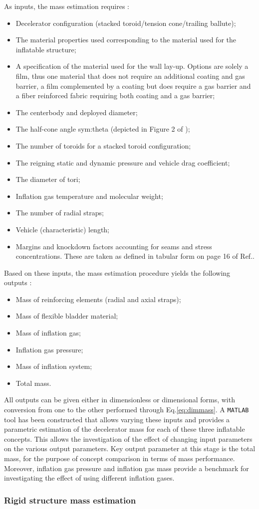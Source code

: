 As inputs, the mass estimation requires \cite{Samareh2011}:
\begin{itemize}
\item Decelerator configuration (stacked toroid/tension cone/trailing ballute);
\item The material properties used corresponding to the material used for the inflatable structure; 
\item A specification of the material used for the wall lay-up. Options are solely a film, thus one material that does not require an additional coating and gas barrier, a film complemented by a coating but does require a gas barrier and a fiber reinforced fabric requiring both coating and a gas barrier;
\item The centerbody and deployed diameter;
\item The half-cone angle \gls{sym:theta} (depicted in Figure 2 of \cite[p.7]{Samareh2011});
\item The number of toroids for a stacked toroid configuration;
\item The reigning static and dynamic pressure and vehicle drag coefficient;
\item The diameter of tori;
\item Inflation gas temperature and molecular weight;
\item The number of radial straps;
\item Vehicle (characteristic) length;
\item Margins and knockdown factors accounting for seams and stress concentrations. These are taken as defined in tabular form on page 16 of Ref.\cite{Samareh2011}.
\end{itemize}

Based on these inputs, the mass estimation procedure yields the following outputs \cite{Samareh2011}:
\begin{itemize}
\item Mass of reinforcing elements (radial and axial straps);
\item Mass of flexible bladder material;
\item Mass of inflation gas;
\item Inflation gas pressure;
\item Mass of inflation system;
\item Total mass.
\end{itemize}
All outputs can be given either in dimensionless or dimensional forms, with conversion from one to the other performed through Eq.\ref{eq:dimmass}. A \texttt{MATLAB} tool has been constructed that allows varying these inputs and provides a parametric estimation of the decelerator mass for each of these three inflatable concepts. This allows the investigation of the effect of changing input parameters on the various output parameters. Key output parameter at this stage is the total mass, for the purpose of concept comparison in terms of mass performance. Moreover, inflation gas pressure and inflation gas mass provide a benchmark for investigating the effect of using different inflation gases.




\subsubsection{Rigid structure mass estimation}
